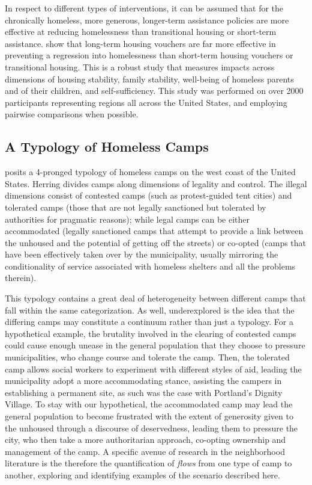 In respect to different types of interventions, it can be assumed that
for the chronically homeless, more generous, longer-term assistance
policies are more effective at reducing homelessness than transitional
housing or short-term assistance. \cite{gubits2018WhatInterventionsa}
show that long-term housing vouchers are far more effective in
preventing a regression into homelessness than short-term housing
vouchers or transitional housing. This is a robust study that measures
impacts across dimensions of housing stability, family stability,
well-being of homeless parents and of their children, and
self-sufficiency. This study was performed on over 2000 participants
representing regions all across the United States, and employing pairwise
comparisons when possible.

\subsection{A Typology of Homeless Camps}

\cite{herring2014NewLogics} posits a 4-pronged typology of
homeless camps on the west coast of the United States. Herring divides
camps along dimensions of legality and control. The illegal dimensions
consist of contested camps (such as protest-guided tent cities) and
tolerated camps (those that are not legally sanctioned but tolerated
by authorities for pragmatic reasons); while legal camps can be either
accommodated (legally sanctioned camps that attempt to provide a link
between the unhoused and the potential of getting off the streets) or
co-opted (camps that have been effectively taken over by the
municipality, usually mirroring the conditionality of service
associated with homeless shelters and all the problems therein).

This typology contains a great deal of heterogeneity between different
camps that fall within the same categorization. As well, underexplored
is the idea that the differing camps may constitute a continuum rather
than just a typology. For a hypothetical example, the brutality
involved in the clearing of contested camps could cause enough unease
in the general population that they choose to pressure municipalities,
who change course and tolerate the camp. Then, the
tolerated camp allows social workers to experiment with different
styles of aid, leading the municipality adopt a more
accommodating stance, assisting the campers in establishing a
permanent site, as such was the case with Portland's Dignity
Village. To stay with our hypothetical, the accommodated camp may lead
the general population to become frustrated with the extent of
generosity given to the unhoused through a discourse of deservedness,
leading them to pressure the city, who then take a more authoritarian
approach, co-opting ownership and management of the camp. A specific
avenue of research in the neighborhood literature is the therefore the
quantification of \emph{flows} from one type of camp to another,
exploring and identifying examples of the scenario described here.

